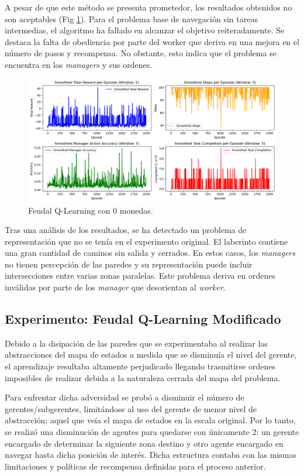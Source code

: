 \documentclass[letterpaper]{article} %
\begin{document}
A pesar de que este método se presenta prometedor, los resultados obtenidos no son aceptables (Fig \ref{fig:q-orig-results}). Para el 
problema base de navegación sin tareas intermedias, el algoritmo ha fallado en alcanzar el objetivo reiteradamente. Se destaca la falta
de obediencia por parte del worker que deriva en una mejora en el número de pasos y recompensa. No obstante, esto indica que el problema 
se encuentra en los \textit{managers} y sus ordenes. 

\begin{figure}[H]
    \centering
    \includegraphics[width=0.9\columnwidth]{q-original-results.png}
    \caption{Feudal Q-Learning con 0 monedas.\label{fig:q-orig-results}}
\end{figure}

Tras una análisis de los resultados, se ha detectado un problema de representación que no se tenía en el experimento original. El laberinto contiene 
una gran cantidad de caminos sin salida y cerrados. En estos casos, los \textit{managers} no tienen percepción de las paredes y su representación puede incluir
intersecciones entre varias zonas paralelas. Este problema deriva en ordenes inválidas por parte de los \textit{manager} que desorientan al \textit{worker}. 

\subsection{Experimento: Feudal Q-Learning Modificado}

Debido a la disipación de las paredes que se experimentaba al realizar las abstracciones del mapa de estados a medida que se disminuía
el nivel del gerente, el aprendizaje resultaba altamente perjudicado llegando trasmitirse ordenes imposibles de realizar debida a la
naturaleza cerrada del mapa del problema.

Para enfrentar dicha adversidad se probó a disminuir el número de gerentes/subgerentes, limitándose al uso del gerente de menor nivel
de abstracción; aquel que veía el mapa de estados en la escala original. Por lo tanto, se realizó una disminución de agentes para 
quedarse con únicamente 2: un gerente encargado de determinar la siguiente zona destino y otro agente encargado en navegar hasta 
dicha posición de interés. Dicha estructura contaba con las mismas limitaciones y políticas de recompensa definidas para el proceso anterior.
\end{document}
